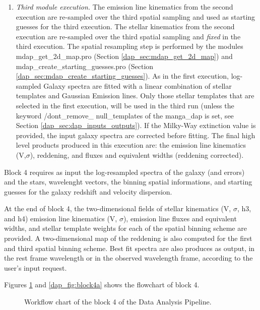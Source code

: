 \documentclass[11pt]{book}
\begin{document}
\begin{enumerate}
\item {\it Third module execution.} The emission line kinematics from
  the second execution are re-sampled over the third spatial sampling
  and used as starting guesses for the third execution. The stellar
  kinematics from the second execution are re-sampled over the third
  spatial sampling and {\it fixed} in the third execution.  The
  spatial resampling step is performed by the modules
  mdap\_get\_2d\_map.pro (Section \ref{dap_sec:mdap_get_2d_map}) and
  mdap\_create\_starting\_guesses.pro (Section
  \ref{dap_sec:mdap_create_starting_guesses}). As in the first
  execution, log-sampled Galaxy spectra are fitted with a linear
  combination of stellar templates and Gaussian Emission lines. Only
  those stellar templates that are selected in the first execution,
  will be used in the third run (unless the keyword
  /dont\_remove\_ null\_templates of the manga\_dap is set, see
  Section \ref{dap_sec:dap_inputs_outputs}). If the Milky-Way extinction value is
  provided, the input galaxy spectra are corrected before fitting. The
  final high level products produced in this execution are: the
  emission line kinematics (V,$\sigma$), reddening, and fluxes and
  equivalent widths (reddening corrected).

\end{enumerate}

Block 4 requires as input the log-resampled spectra of the galaxy (and
errors) and the stars, wavelenght vectors, the binning spatial
informations, and starting guesses for the galaxy redshift and
velocity dispersion.

At the end of block 4, the two-dimensional fields of stellar
kinematics (V, $\sigma$, h3, and h4) emission line kinematics (V,
$\sigma$), emission line fluxes and equivalent widths, and stellar
template weights for each of the spatial binning scheme are
provided. A two-dimensional map of the reddening is also computed for
the first and third spatial binning scheme. Best fit spectra are also
produces as output, in the rest frame wavelength or in the observed
wavelength frame, according to the user's input request.

Figures \ref{dap_fig:block4} and \ref{dap_fig:block4a} shows the
flowchart of block 4.

\begin{figure}
\begin{center}
\caption{Workflow chart of the block 4 of the Data Analysis Pipeline.}
 \label{dap_fig:block4}
\end{center}
\end{figure}
\end{document}
